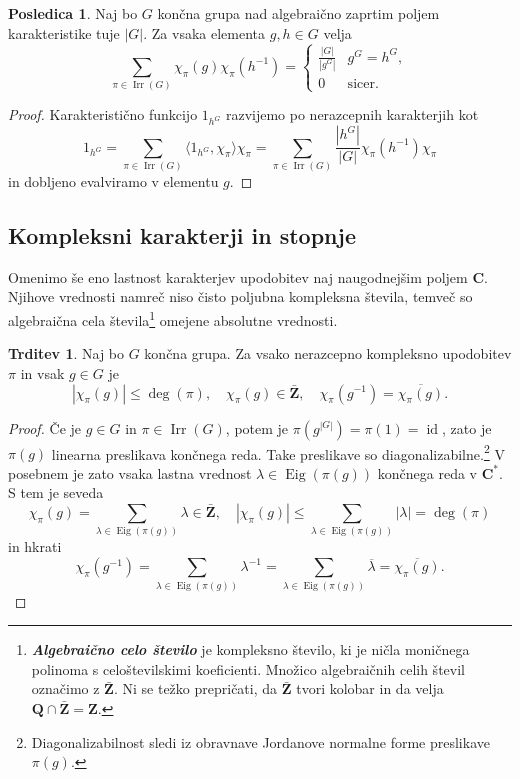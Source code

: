 \documentclass[11pt]{book}
\def\ZZ{\mathbf{Z}}
\def\QQ{\mathbf{Q}}
\def\CC{\mathbf{C}}
\DeclareMathOperator\Irr{Irr}
\DeclareMathOperator\Eig{Eig}
\DeclareMathOperator\id{id}
\def\definicija{\color{rdeca}\bf\em}
\theoremstyle{definition}
\theoremstyle{zgled}
\theoremstyle{odprtproblem}
\theoremstyle{domacanaloga}
\newenvironment{dokaz}
    {\color{siva}\begin{proof}}
    {\end{proof}}
\theoremstyle{izrek}
\newtheorem*{trditev}{Trditev}
\newtheorem*{posledica}{Posledica}
\begin{document}
\begin{posledica}
Naj bo $G$ končna grupa nad algebraično zaprtim poljem karakteristike tuje $|G|$. Za vsaka elementa $g,h \in G$ velja
\[
    \sum_{\pi \in \Irr(G)} \chi_{\pi}(g) \chi_{\pi}(h^{-1}) = \begin{cases}
        \frac{|G|}{|g^G|} & g^G = h^G, \\
        0 & \text{sicer.}
    \end{cases}
\]
\end{posledica}
\begin{dokaz}
Karakteristično funkcijo $1_{h^G}$ razvijemo po nerazcepnih karakterjih kot
\[
    1_{h^G} = \sum_{\pi \in \Irr(G)} \langle 1_{h^G}, \chi_{\pi} \rangle \chi_{\pi}
    = \sum_{\pi \in \Irr(G)} \frac{|h^G|}{|G|} \chi_{\pi}(h^{-1}) \chi_{\pi}
\]
in dobljeno evalviramo v elementu $g$.
\end{dokaz}

\subsection{Kompleksni karakterji in stopnje}

Omenimo še eno lastnost karakterjev upodobitev naj naugodnejšim poljem $\CC$. Njihove vrednosti namreč niso čisto poljubna kompleksna števila, temveč so algebraična cela števila\footnote{{\definicija Algebraično celo število} je kompleksno število, ki je ničla moničnega polinoma s celoštevilskimi koeficienti. Množico algebraičnih celih števil označimo z $\bar{\ZZ}$. Ni se težko prepričati, da $\bar{\ZZ}$ tvori kolobar in da velja $\QQ \cap \bar{\ZZ} = \ZZ$.} omejene absolutne vrednosti. 

\begin{trditev}
Naj bo $G$ končna grupa. Za vsako nerazcepno kompleksno upodobitev $\pi$ in vsak $g \in G$ je
\[
    |\chi_{\pi}(g)| \leq \deg(\pi), \quad
    \chi_{\pi}(g) \in \bar{\ZZ}, \quad
    \chi_{\pi}(g^{-1}) = \overline{\chi_{\pi}(g)}. 
\] 
\end{trditev}
\begin{dokaz}
Če je $g \in G$ in $\pi \in \Irr(G)$, potem je $\pi(g^{|G|}) = \pi(1) = \id$, zato je $\pi(g)$ linearna preslikava končnega reda. Take preslikave so diagonalizabilne.\footnote{Diagonalizabilnost sledi iz obravnave Jordanove normalne forme preslikave $\pi(g)$.} V posebnem je zato vsaka lastna vrednost $\lambda \in \Eig(\pi(g))$ končnega reda v $\CC^*$. S tem je seveda
\[
    \chi_{\pi}(g) = \sum_{\lambda \in \Eig(\pi(g))} \lambda \in \bar{\ZZ},
    \quad
    |\chi_{\pi}(g)| \leq \sum_{\lambda \in \Eig(\pi(g))} |\lambda| = \deg(\pi)
\]
in hkrati
\[
    \chi_{\pi}(g^{-1}) = \sum_{\lambda \in \Eig(\pi(g))} \lambda^{-1}
    = \sum_{\lambda \in \Eig(\pi(g))} \overline{\lambda}
    = \overline{\chi_{\pi}(g)}.
\]
\end{dokaz}
\end{document}
